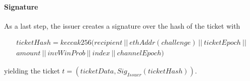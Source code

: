\paragraph{Signature}
\label{sec:tickets:issuance:signature}

As a last step, the issuer creates a signature over the hash of the ticket with

\begin{multline*}
    ticketHash = keccak256 (recipient \ || \ ethAddr(challenge) \ || \ ticketEpoch \ ||  \\
    amount \ || \ invWinProb \ || \ index \ || \ channelEpoch)
\end{multline*}

yielding the ticket $t = (ticketData, Sig_{Issuer}(ticketHash))$.